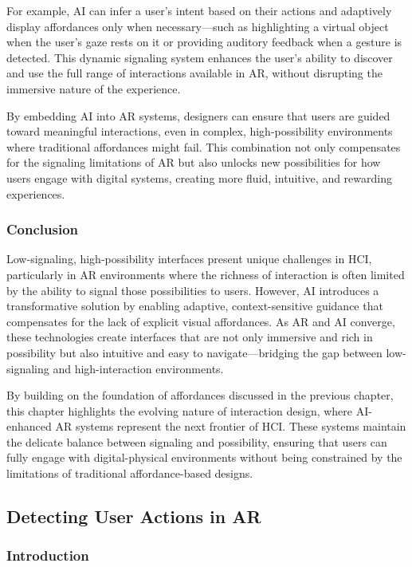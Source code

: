 For example, AI can infer a user’s intent based on their actions and adaptively display affordances only when necessary—such as highlighting a virtual object when the user’s gaze rests on it or providing auditory feedback when a gesture is detected.
This dynamic signaling system enhances the user's ability to discover and use the full range of interactions available in AR, without disrupting the immersive nature of the experience.

By embedding AI into AR systems, designers can ensure that users are guided toward meaningful interactions, even in complex, high-possibility environments where traditional affordances might fail.
This combination not only compensates for the signaling limitations of AR but also unlocks new possibilities for how users engage with digital systems, creating more fluid, intuitive, and rewarding experiences.

\subsubsection{ Conclusion }

Low-signaling, high-possibility interfaces present unique challenges in HCI, particularly in AR environments where the richness of interaction is often limited by the ability to signal those possibilities to users.
However, AI introduces a transformative solution by enabling adaptive, context-sensitive guidance that compensates for the lack of explicit visual affordances.
As AR and AI converge, these technologies create interfaces that are not only immersive and rich in possibility but also intuitive and easy to navigate—bridging the gap between low-signaling and high-interaction environments.

By building on the foundation of affordances discussed in the previous chapter, this chapter highlights the evolving nature of interaction design, where AI-enhanced AR systems represent the next frontier of HCI.
These systems maintain the delicate balance between signaling and possibility, ensuring that users can fully engage with digital-physical environments without being constrained by the limitations of traditional affordance-based designs.

\subsection{ Detecting User Actions in AR}

\subsubsection{Introduction}

